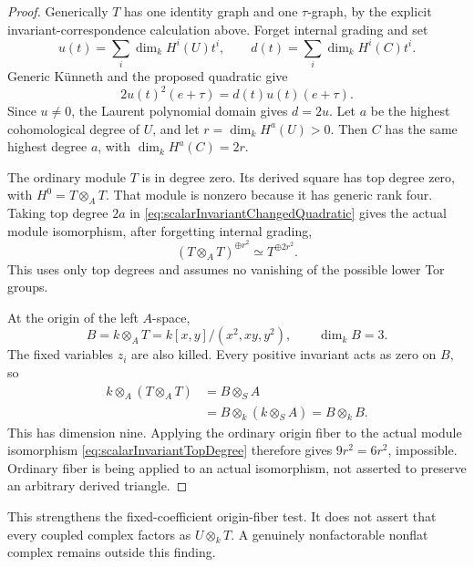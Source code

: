 \begin{proof}
Generically \(T\) has one identity graph and one
\(\tau\)-graph, by the explicit invariant-correspondence
calculation above. Forget internal grading and set
\[
 u(t)=\sum_i\dim_kH^i(U)t^i,\qquad
 d(t)=\sum_i\dim_kH^i(C)t^i.
\]
Generic K\"unneth and the proposed quadratic give
\[
             2u(t)^2(e+\tau)=d(t)u(t)(e+\tau).
\]
Since \(u\ne0\), the Laurent polynomial domain gives
\(d=2u\). Let \(a\) be the highest cohomological degree
of \(U\), and let \(r=\dim_kH^a(U)>0\).
Then \(C\) has the same highest degree \(a\), with
\(\dim_kH^a(C)=2r\).

The ordinary module \(T\) is in degree zero. Its derived
square has top degree zero, with \(H^0=T\otimes_AT\).
That module is nonzero because it has generic rank four.
Taking top degree \(2a\) in
\eqref{eq:scalarInvariantChangedQuadratic} gives the
actual module isomorphism, after forgetting internal grading,
\begin{equation}\label{eq:scalarInvariantTopDegree}
             (T\otimes_AT)^{\oplus r^2}
                         \simeq T^{\oplus2r^2}.
\end{equation}
This uses only top degrees and assumes no vanishing of
the possible lower Tor groups.

At the origin of the left \(A\)-space,
\[
 B=k\otimes_AT
   =k[x,y]/(x^2,xy,y^2),\qquad \dim_kB=3.
\]
The fixed variables \(z_i\) are also killed. Every
positive invariant acts as zero on \(B\), so
\[
 \begin{aligned}
 k\otimes_A(T\otimes_AT)
   &=B\otimes_SA\\
   &=B\otimes_k(k\otimes_SA)
     =B\otimes_kB.
 \end{aligned}
\]
This has dimension nine. Applying the ordinary origin
fiber to the actual module isomorphism
\eqref{eq:scalarInvariantTopDegree} therefore gives
\(9r^2=6r^2\), impossible.
Ordinary fiber is being applied to an actual isomorphism,
not asserted to preserve an arbitrary derived triangle.
\end{proof}

This strengthens the fixed-coefficient origin-fiber test.
It does not assert that every coupled complex factors
as \(U\otimes_kT\). A genuinely nonfactorable nonflat
complex remains outside this finding.

